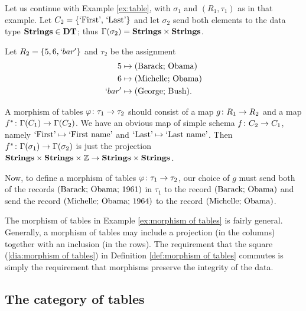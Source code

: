 \documentclass{amsart}
\begin{document}
\begin{example}\label{ex:morphism of tables}

Let us continue with Example \ref{ex:table}, with $\sigma_1$ and $(R_1,\tau_1)$ as in that example.  Let $C_2=\{\textnormal{`First', `Last'}\}$ and let $\sigma_2$ send both elements to the data type ${\bf Strings}\in{\bf DT}$; thus $\Gamma(\sigma_2)={\bf Strings}\times{\bf Strings}$.  

Let $R_2=\{5,6,`bar'\}$ and $\tau_2$ be the assignment \begin{align*}5&\mapsto \textnormal{(Barack; Obama)}\\6 &\mapsto\textnormal{(Michelle; Obama)}\\`bar' &\mapsto\textnormal{(George; Bush)}.\end{align*}  

A morphism of tables $\varphi\colon\tau_1\rightarrow\tau_2$ should consist of a map $g\colon R_1\rightarrow R_2$ and a map $f^*\colon\Gamma(C_1)\rightarrow\Gamma(C_2)$.   We have an obvious map of simple schema $f\colon C_2\rightarrow C_1$, namely $\textnormal{`First'}\mapsto\textnormal{`First name'}$ and $\textnormal{`Last'}\mapsto\textnormal{`Last name'}$.  Then $f^*\colon\Gamma(\sigma_1)\rightarrow\Gamma(\sigma_2)$ is just the projection ${\bf Strings}\times{\bf Strings}\times{\mathbb Z}\rightarrow{\bf Strings}\times{\bf Strings}$.

Now, to define a morphism of tables $\varphi\colon\tau_1\rightarrow\tau_2$, our choice of $g$ must send both of the records $(\textnormal{Barack; Obama; 1961})$ in $\tau_1$ to the record $(\textnormal{Barack; Obama})$ and send the record $(\textnormal{Michelle; Obama; 1964})$ to the record $(\textnormal{Michelle; Obama})$.  

\end{example}

\begin{remark}\label{rem:table integrity}

The morphism of tables in Example \ref{ex:morphism of tables} is fairly general.  Generally, a morphism of tables may include a projection (in the columns) together with an inclusion (in the rows).  The requirement that the square (\ref{dia:morphism of tables}) in Definition \ref{def:morphism of tables} commutes is simply the requirement that morphisms preserve the integrity of the data.

\end{remark}

\subsection{The category of tables}
\end{document}

